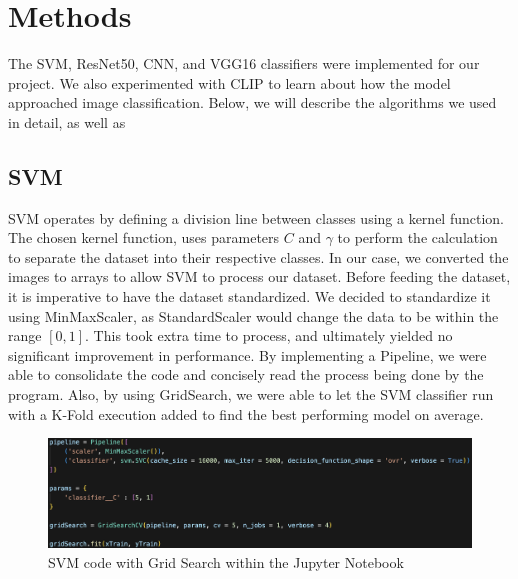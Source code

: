 \graphicspath{ {project_images/} }

\section{Methods}

The SVM, ResNet50, CNN, and VGG16 classifiers were implemented for our project. We also experimented with CLIP to learn about how the model approached image classification.
Below, we will describe the algorithms we used in detail, as well as

\subsection{SVM}
SVM operates by defining a division line between classes using a kernel function. 
The chosen kernel function, uses parameters $C$ and $\gamma$ to perform the calculation to separate the dataset into their respective classes.
In our case, we converted the images to arrays to allow SVM to process our dataset.
Before feeding the dataset, it is imperative to have the dataset standardized.
We decided to standardize it using MinMaxScaler, as StandardScaler would change the data to be within the range $[0,1]$.
This took extra time to process, and ultimately yielded no significant improvement in performance.
By implementing a Pipeline, we were able to consolidate the code and concisely read the process being done by the program.
Also, by using GridSearch, we were able to let the SVM classifier run with a K-Fold execution added to find the best performing model on average.

\begin{figure}[h]
	\centering
	\includegraphics[scale=0.5]{SVM_explained.png}
	\caption{SVM code with Grid Search within the Jupyter Notebook}
	\label{fig:figure1}
\end{figure}

